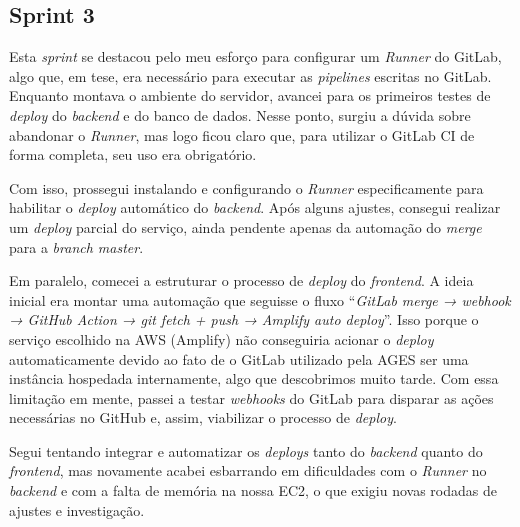 \subsection{Sprint 3}

Esta \textit{sprint} se destacou pelo meu esforço para configurar um \textit{Runner} do GitLab, algo que, em tese, era necessário para executar as \textit{pipelines} escritas no GitLab. Enquanto montava o ambiente do servidor, avancei para os primeiros testes de \textit{deploy} do \textit{backend} e do banco de dados. Nesse ponto, surgiu a dúvida sobre abandonar o \textit{Runner}, mas logo ficou claro que, para utilizar o GitLab CI de forma completa, seu uso era obrigatório.

Com isso, prossegui instalando e configurando o \textit{Runner} especificamente para habilitar o \textit{deploy} automático do \textit{backend}. Após alguns ajustes, consegui realizar um \textit{deploy} parcial do serviço, ainda pendente apenas da automação do \textit{merge} para a \textit{branch master}.

Em paralelo, comecei a estruturar o processo de \textit{deploy} do \textit{frontend}. A ideia inicial era montar uma automação que seguisse o fluxo “\textit{GitLab merge → webhook → GitHub Action → git fetch + push → Amplify auto deploy}”. Isso porque o serviço escolhido na AWS (Amplify) não conseguiria acionar o \textit{deploy} automaticamente devido ao fato de o GitLab utilizado pela AGES ser uma instância hospedada internamente, algo que descobrimos muito tarde. Com essa limitação em mente, passei a testar \textit{webhooks} do GitLab para disparar as ações necessárias no GitHub e, assim, viabilizar o processo de \textit{deploy}.

Segui tentando integrar e automatizar os \textit{deploys} tanto do \textit{backend} quanto do \textit{frontend}, mas novamente acabei esbarrando em dificuldades com o \textit{Runner} no \textit{backend} e com a falta de memória na nossa EC2, o que exigiu novas rodadas de ajustes e investigação.
\\

\noindent{}
